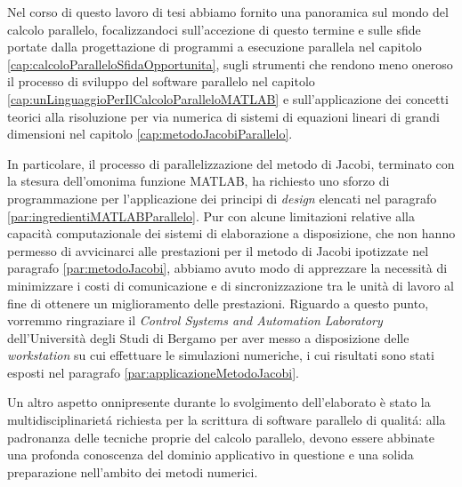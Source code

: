 Nel corso di questo lavoro di tesi abbiamo fornito una panoramica sul mondo del calcolo parallelo, focalizzandoci sull'accezione di questo termine e sulle sfide portate dalla progettazione di programmi a esecuzione parallela nel capitolo \ref{cap:calcoloParalleloSfidaOpportunita}, sugli strumenti che rendono meno oneroso il processo di sviluppo del software parallelo
nel capitolo \ref{cap:unLinguaggioPerIlCalcoloParalleloMATLAB} e sull'applicazione dei concetti teorici alla risoluzione per via numerica di sistemi di equazioni lineari di grandi dimensioni nel capitolo \ref{cap:metodoJacobiParallelo}.

In particolare, il processo di parallelizzazione del metodo di Jacobi, terminato con la stesura dell'omonima funzione 
MATLAB, ha richiesto uno sforzo di programmazione per l'applicazione dei principi di \textit{design} elencati nel paragrafo \ref{par:ingredientiMATLABParallelo}.\newline
Pur con alcune limitazioni relative alla capacit\`a computazionale dei sistemi di elaborazione a disposizione, che non hanno 
permesso di avvicinarci alle prestazioni per il metodo di Jacobi ipotizzate nel paragrafo \ref{par:metodoJacobi}, 
abbiamo avuto modo di apprezzare la necessit\`a di minimizzare i costi di comunicazione e di sincronizzazione tra le unit\`a di lavoro 
al fine di ottenere un miglioramento delle prestazioni.\newline
Riguardo a questo punto, vorremmo ringraziare il \textit{Control Systems and Automation Laboratory} dell'Universit\`a degli Studi 
di Bergamo per aver messo a disposizione delle \textit{workstation} su cui effettuare le simulazioni numeriche, i cui risultati sono stati esposti nel paragrafo \ref{par:applicazioneMetodoJacobi}.

Un altro aspetto onnipresente durante lo svolgimento dell'elaborato \`e stato la multidisciplinariet\'a richiesta per la scrittura 
di software parallelo di qualit\'a: alla padronanza delle tecniche proprie del calcolo parallelo, devono essere 
abbinate una profonda conoscenza del dominio applicativo in questione e una solida preparazione nell'ambito dei metodi numerici.